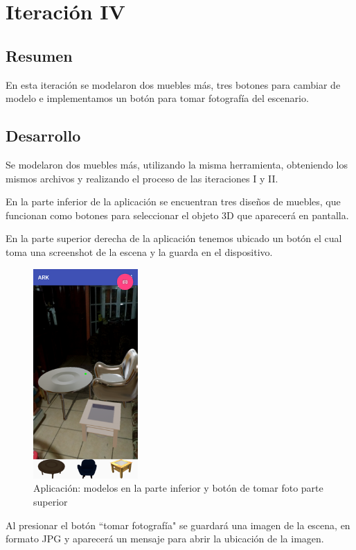 \section{Iteración IV}
\subsection{Resumen}
En esta iteración se modelaron dos muebles más, tres botones para cambiar de modelo e implementamos un botón para tomar fotografía del escenario.
\subsection{Desarrollo}
Se modelaron dos muebles más, utilizando la misma herramienta, obteniendo los mismos archivos y realizando el proceso de las iteraciones I y II.

En la parte inferior de la aplicación se encuentran tres diseños de muebles, que funcionan como botones para seleccionar el objeto 3D que aparecerá en pantalla.

En la parte superior derecha de la aplicación tenemos ubicado un botón el cual toma una screenshot de la escena y la guarda en el dispositivo.

\begin{figure}[H]
	\centering
	\includegraphics[width=4cm,height=8cm]{imagenes/iteraciones/all.png}
	\caption{Aplicación: modelos en la parte inferior y botón de tomar foto parte superior}
	\label{fig:aplicacion}
\end{figure} 

Al presionar el botón ``tomar fotografía" se guardará una imagen de la escena, en formato JPG y aparecerá un mensaje para abrir la ubicación de la imagen.  


